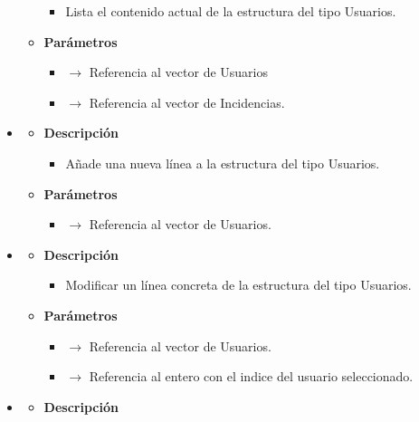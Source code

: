 \begin{itemize}
\begin{itemize}
\begin{itemize}
			\item Lista el contenido actual de la estructura del tipo Usuarios.
		\end{itemize}
        \item \textbf{Parámetros}
		\begin{itemize}
			\item {} $\rightarrow$ Referencia al vector de Usuarios
            \item {} $\rightarrow$ Referencia al vector de Incidencias.
		\end{itemize}
	\end{itemize}
    \item{}
	\begin{itemize}
		\item \textbf{Descripción}
        \begin{itemize}
			\item Añade una nueva línea a la estructura del tipo Usuarios.
		\end{itemize}
        \item \textbf{Parámetros}
		\begin{itemize}
			\item {} $\rightarrow$ Referencia al vector de Usuarios.
		\end{itemize}
	\end{itemize}
	\item{}
	\begin{itemize}
		\item \textbf{Descripción}
        \begin{itemize}
			\item Modificar un línea concreta de la estructura del tipo Usuarios.
		\end{itemize}
        \item \textbf{Parámetros}
		\begin{itemize}
			\item {} $\rightarrow$ Referencia al vector de Usuarios.
            \item {} $\rightarrow$ Referencia al entero con el indice del usuario seleccionado.
		\end{itemize}
	\end{itemize}
    \item{}
	\begin{itemize}
		\item \textbf{Descripción}
        \begin{itemize}

\end{itemize}
\end{itemize}
\end{itemize}
